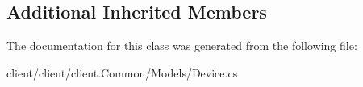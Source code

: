 \subsection*{Additional Inherited Members}


The documentation for this class was generated from the following file\-:\begin{DoxyCompactItemize}
\item 
client/client/client.\-Common/\-Models/Device.\-cs\end{DoxyCompactItemize}
